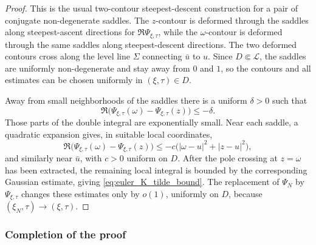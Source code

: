 \documentclass[11pt]{article}
\numberwithin{equation}{section}
\newcommand{\1}{\mathbf 1}
\begin{document}
\begin{proof}
This is the usual two-contour steepest-descent construction for a pair of
conjugate non-degenerate saddles.  The \(z\)-contour is deformed through the
saddles along steepest-ascent directions for \(\Re\Psi_{\xi,\tau}\), while the
\(\omega\)-contour is deformed through the same saddles along steepest-descent
directions.  The two deformed contours cross along the level line \(\Sigma\)
connecting \(\bar u\) to \(u\).  Since \(D\Subset\mathcal L\), the saddles are
uniformly non-degenerate and stay away from \(0\) and \(1\), so the contours and
all estimates can be chosen uniformly in \((\xi,\tau)\in D\).

Away from small neighborhoods of the saddles there is a uniform
\(\delta>0\) such that
\[
    \Re\bigl(\Psi_{\xi,\tau}(\omega)-\Psi_{\xi,\tau}(z)\bigr)
    \le -\delta .
\]
Those parts of the double integral are exponentially small.  Near each saddle,
a quadratic expansion gives, in suitable local coordinates,
\[
    \Re\bigl(\Psi_{\xi,\tau}(\omega)-\Psi_{\xi,\tau}(z)\bigr)
    \le
    -c\bigl(|\omega-u|^2+|z-u|^2\bigr),
\]
and similarly near \(\bar u\), with \(c>0\) uniform on \(D\).  After the pole
crossing at \(z=\omega\) has been extracted, the remaining local integral is
bounded by the corresponding Gaussian estimate, giving \eqref{eq:euler_K_tilde_bound}.
The replacement of \(\Psi_N\) by \(\Psi_{\xi,\tau}\) changes these estimates only
by \(o(1)\), uniformly on \(D\), because \((\xi_N,\tau)\to(\xi,
\tau)\).
\end{proof}

\subsubsection{Completion of the proof}
\end{document}

